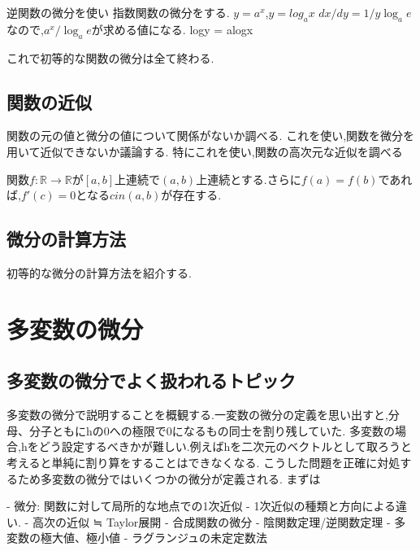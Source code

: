 \documentclass{ujarticle}
\begin{document}
\begin{prop}[指数関数の微分]
逆関数の微分を使い
指数関数の微分をする.
$y= a^x$,$y= log_ax$
$dx/dy = 1/y \log_ae$なので,$a^x/\log_ae$が求める値になる.
logy = alogx
\end{prop}

これで初等的な関数の微分は全て終わる.

\subsection{関数の近似}
関数の元の値と微分の値について関係がないか調べる.
これを使い,関数を微分を用いて近似できないか議論する.
特にこれを使い,関数の高次元な近似を調べる

\begin{thm}[ロルの定理]
関数$f: \mathbb{R} \to \mathbb{R}$が$[a, b]$上連続で$(a, b)$上連続とする.さらに$f(a) = f(b)$であれば,$f'(c) = 0$となる$c in (a,b)$が存在する.
\end{thm}

\begin{thm}[平均値の定理]

\end{thm}

\begin{thm}[テイラーの定理]

\end{thm}

\subsection{微分の計算方法}
初等的な微分の計算方法を紹介する.


\section{多変数の微分}
\subsection{多変数の微分でよく扱われるトピック}
多変数の微分で説明することを概観する.一変数の微分の定義を思い出すと,分母、分子ともにhの0への極限で0になるもの同士を割り残していた.
多変数の場合,hをどう設定するべきかが難しい.例えばhを二次元のベクトルとして取ろうと考えると単純に割り算をすることはできなくなる.
こうした問題を正確に対処するため多変数の微分ではいくつかの微分が定義される.
まずは

- 微分: 関数に対して局所的な地点での1次近似
- 1次近似の種類と方向による違い.
- 高次の近似 ≒ Taylor展開
- 合成関数の微分
- 陰関数定理/逆関数定理
- 多変数の極大値、極小値
  - ラグランジュの未定定数法
\end{document}
